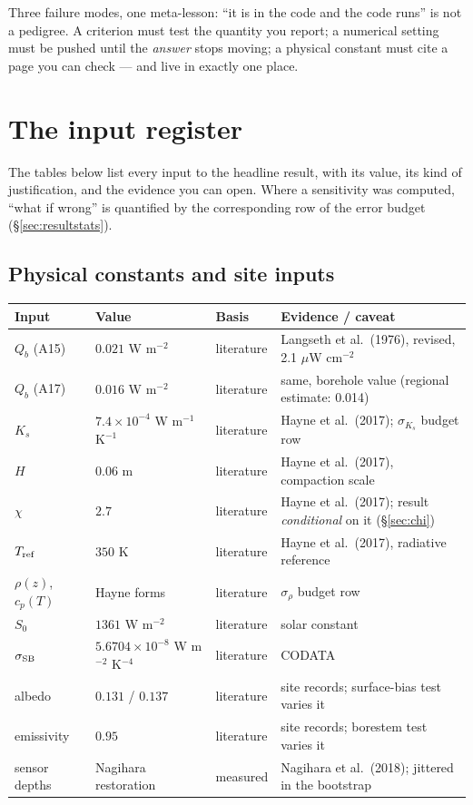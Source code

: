 \documentclass[11pt]{report}
\begin{document}
\begin{keypt}
Three failure modes, one meta-lesson: ``it is in the code and the code runs''
is not a pedigree. A criterion must test the quantity you report; a numerical
setting must be pushed until the \emph{answer} stops moving; a physical
constant must cite a page you can check --- and live in exactly one place.
\end{keypt}

\section{The input register}\label{sec:register}

The tables below list every input to the headline result, with its value, its
kind of justification, and the evidence you can open. Where a sensitivity was
computed, ``what if wrong'' is quantified by the corresponding row of the
error budget (\S\ref{sec:resultstats}).

\subsection*{Physical constants and site inputs}

\begin{center}\footnotesize
\begin{tabular}{@{}llll@{}}
\toprule
Input & Value & Basis & Evidence / caveat \\
\midrule
$Q_b$ (A15) & $0.021$ W m$^{-2}$ & literature & Langseth et al.\ (1976), revised, 2.1 $\mu$W cm$^{-2}$ \\
$Q_b$ (A17) & $0.016$ W m$^{-2}$ & literature & same, borehole value (regional estimate: 0.014) \\
$K_s$ & $7.4\times10^{-4}$ W m$^{-1}$ K$^{-1}$ & literature & Hayne et al.\ (2017); $\sigma_{K_s}$ budget row \\
$H$ & $0.06$ m & literature & Hayne et al.\ (2017), compaction scale \\
$\chi$ & $2.7$ & literature & Hayne et al.\ (2017); result \emph{conditional} on it (\S\ref{sec:chi}) \\
$T_{\rm ref}$ & $350$ K & literature & Hayne et al.\ (2017), radiative reference \\
$\rho(z)$, $c_p(T)$ & Hayne forms & literature & $\sigma_\rho$ budget row \\
$S_0$ & $1361$ W m$^{-2}$ & literature & solar constant \\
$\sigma_{\rm SB}$ & $5.6704\times10^{-8}$ W m$^{-2}$ K$^{-4}$ & literature & CODATA \\
albedo & $0.131$ / $0.137$ & literature & site records; surface-bias test varies it \\
emissivity & $0.95$ & literature & site records; borestem test varies it \\
sensor depths & Nagihara restoration & measured & Nagihara et al.\ (2018); jittered in the bootstrap \\
\bottomrule
\end{tabular}
\end{center}
\end{document}
